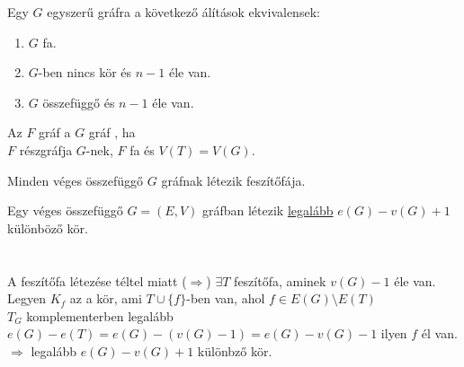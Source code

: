 \begin{frame} 
\begin{tcolorbox}[title={Tétel: Ekvivalens állítások n-pontú fákra}]
Egy $G$ egyszerű gráfra a következő álítások ekvivalensek:
\begin{enumerate}
\item $G$ fa.
\item $G$-ben nincs kör és $n - 1$ éle van.
\item $G$ összefüggő és $n - 1$ éle van.
\end{enumerate}
\end{tcolorbox}

\begin{tcolorbox}[title={Def.: Feszítőfa}]
Az $F$ gráf a $G$ gráf , ha\\
$F$ részgráfja $G$-nek, $F$ fa és $V(T) = V(G)$.
\end{tcolorbox}

\begin{tcolorbox}[title={Tétel: Feszítőfa létezése}]
Minden véges összefüggő $G$ gráfnak létezik feszítőfája.
\end{tcolorbox}

\end{frame}

\begin{frame} 
\begin{tcolorbox}[title={Tétel: Körök száma}]
Egy véges összefüggő $G = (E, V)$ gráfban létezik \underline{legalább} $e(G) - v(G) + 1$ különböző kör.\\
\tcblower
\msmallskip
\underline{}\\
\mmedskip
\\
A feszítőfa létezése téltel miatt ($\Rightarrow$) $\exists T$ feszítőfa, aminek $v(G) - 1$ éle van.\\
Legyen $K_f$ az a kör, ami $T \cup \{f\}$-ben van, ahol $f \in E(G) \setminus E(T)$\\
$T_G$ komplementerben legalább $e(G) - e(T) = e(G) - (v(G) - 1) = e(G) - v(G) - 1$ ilyen $f$ él van.\\
$\Rightarrow$ legalább $e(G) - v(G) + 1$ különbző kör.
\end{tcolorbox}
\end{frame}

